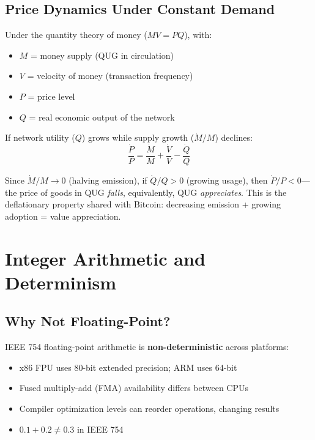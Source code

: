 \documentclass[11pt,a4paper]{article}
\begin{document}
\subsection{Price Dynamics Under Constant Demand}

Under the quantity theory of money ($MV = PQ$), with:
\begin{itemize}
    \item $M$ = money supply (QUG in circulation)
    \item $V$ = velocity of money (transaction frequency)
    \item $P$ = price level
    \item $Q$ = real economic output of the network
\end{itemize}

If network utility ($Q$) grows while supply growth ($\dot{M}/M$) declines:
\begin{equation}
    \frac{\dot{P}}{P} = \frac{\dot{M}}{M} + \frac{\dot{V}}{V} - \frac{\dot{Q}}{Q}
\end{equation}

Since $\dot{M}/M \to 0$ (halving emission), if $\dot{Q}/Q > 0$ (growing usage), then $\dot{P}/P < 0$---the price of goods in QUG \emph{falls}, equivalently, QUG \emph{appreciates}. This is the deflationary property shared with Bitcoin: decreasing emission + growing adoption = value appreciation.

\section{Integer Arithmetic and Determinism}
\label{sec:integer}

\subsection{Why Not Floating-Point?}

IEEE 754 floating-point arithmetic is \textbf{non-deterministic} across platforms:
\begin{itemize}
    \item x86 FPU uses 80-bit extended precision; ARM uses 64-bit
    \item Fused multiply-add (FMA) availability differs between CPUs
    \item Compiler optimization levels can reorder operations, changing results
    \item $0.1 + 0.2 \neq 0.3$ in IEEE 754
\end{itemize}
\end{document}
